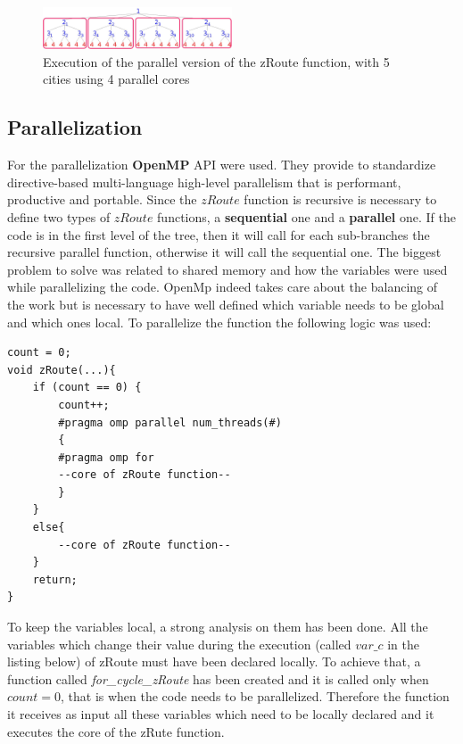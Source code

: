 \documentclass[11pt,conference]{IEEEtran}
\begin{document}
\begin{figure}[h!]
  \centering
    \includegraphics[width=0.5\textwidth]{tree-par}
    \caption{Execution of the parallel version of the zRoute function, with 5 cities using 4 parallel cores}
    \label{fig:tree-par}
\end{figure}

\subsection{Parallelization}
For the parallelization \textbf{OpenMP} API were used. They provide to standardize directive-based multi-language high-level parallelism that is performant, productive and portable\cite{citation4}. Since the $zRoute$ function is recursive is necessary to define two types of $zRoute$ functions, a \textbf{sequential} one and a \textbf{parallel} one. If the code is in the first level of the tree, then it will call for each sub-branches the recursive parallel function, otherwise it will call the sequential one.
\newline
The biggest problem to solve was related to shared memory and how the variables were used while parallelizing the code. OpenMp indeed takes care about the balancing of the work but is necessary to have well defined which variable needs to be global and which ones local.
\newline
To parallelize the function the following logic was used:
\begin{lstlisting}
count = 0;
void zRoute(...){
    if (count == 0) {
    	count++;
    	#pragma omp parallel num_threads(#)
    	{
    	#pragma omp for
    	--core of zRoute function--
    	}
    }
    else{
    	--core of zRoute function--
    }
    return;
}
\end{lstlisting}

To keep the variables local, a strong analysis on them has been done. All the variables which change their value during the execution (called $var\_c$ in the listing below) of zRoute must have been declared locally. To achieve that, a function called \textit{for\_cycle\_zRoute} has been created and it is called only when $count = 0$, that is  when the code needs to be parallelized. Therefore the function it receives as input all these variables which need to be locally declared and it executes the core of the zRute function.
\end{document}
